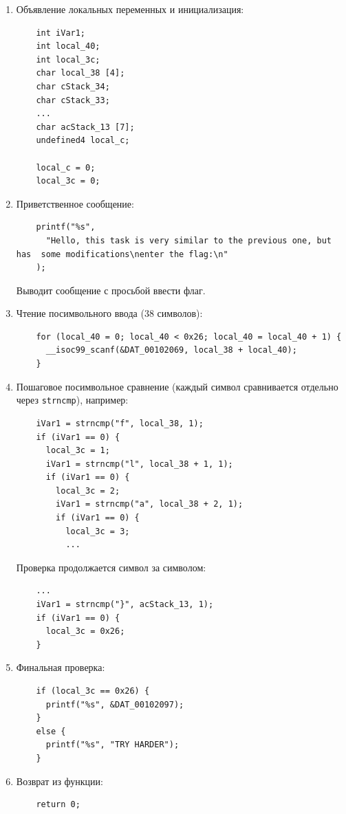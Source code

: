 \documentclass{article}
\begin{document}
\begin{enumerate}
    \item Объявление локальных переменных и инициализация:
    \begin{verbatim}
    int iVar1;
    int local_40;
    int local_3c;
    char local_38 [4];
    char cStack_34;
    char cStack_33;
    ...
    char acStack_13 [7];
    undefined4 local_c;
    
    local_c = 0;
    local_3c = 0;
    \end{verbatim}

    \item Приветственное сообщение:
    \begin{verbatim}
    printf("%s",
      "Hello, this task is very similar to the previous one, but has  some modifications\nenter the flag:\n"
    );
    \end{verbatim}
    Выводит сообщение с просьбой ввести флаг.

    \item Чтение посимвольного ввода (38 символов):
    \begin{verbatim}
    for (local_40 = 0; local_40 < 0x26; local_40 = local_40 + 1) {
      __isoc99_scanf(&DAT_00102069, local_38 + local_40);
    }
    \end{verbatim}

    \item Пошаговое посимвольное сравнение (каждый символ сравнивается отдельно через \texttt{strncmp}), например:
    \begin{verbatim}
    iVar1 = strncmp("f", local_38, 1);
    if (iVar1 == 0) {
      local_3c = 1;
      iVar1 = strncmp("l", local_38 + 1, 1);
      if (iVar1 == 0) {
        local_3c = 2;
        iVar1 = strncmp("a", local_38 + 2, 1);
        if (iVar1 == 0) {
          local_3c = 3;
          ...
    \end{verbatim}

    Проверка продолжается символ за символом:
    \begin{verbatim}
    ...
    iVar1 = strncmp("}", acStack_13, 1);
    if (iVar1 == 0) {
      local_3c = 0x26;
    }
    \end{verbatim}

    \item Финальная проверка:
    \begin{verbatim}
    if (local_3c == 0x26) {
      printf("%s", &DAT_00102097);
    }
    else {
      printf("%s", "TRY HARDER");
    }
    \end{verbatim}

    \item Возврат из функции:
    \begin{verbatim}
    return 0;
    \end{verbatim}
\end{enumerate}
\end{document}
